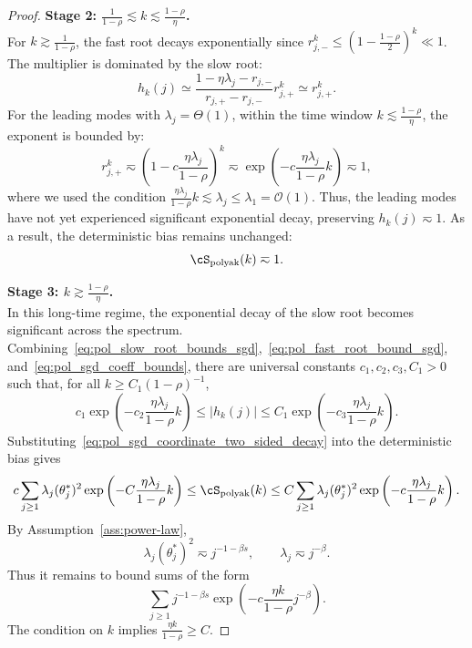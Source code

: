 \documentclass[11pt]{article}
\newcommand{\polyak}{\mathrm{polyak}}
\begin{document}
\begin{proof}
\textbf{Stage 2: $\frac{1}{1-\rho} \lesssim k \lesssim \frac{1-\rho}{\eta}$.} \\
For $k \gtrsim \frac{1}{1-\rho}$, the fast root decays exponentially since $r_{j,-}^k \le \left(1-\frac{1-\rho}{2}\right)^k \ll 1$. The multiplier is  dominated by the slow root:
\[
    h_k(j) \simeq \frac{1-\eta\lambda_j - r_{j,-}}{r_{j,+} - r_{j,-}} r_{j,+}^k \simeq r_{j,+}^k.
\]
For the leading modes with $\lambda_j = \Theta(1)$, within the time window $k \lesssim \frac{1-\rho}{\eta}$, the exponent is bounded by:
\[
    r_{j,+}^k \eqsim \left(1 - c\frac{\eta\lambda_j}{1-\rho}\right)^k \eqsim \exp\left(-c\frac{\eta\lambda_j}{1-\rho}k\right) \eqsim 1,
\]
where we used the condition $\frac{\eta\lambda_j}{1-\rho}k \lesssim \lambda_j \le \lambda_1 = \mathcal{O}(1)$. Thus, the leading modes have not yet experienced significant exponential decay, preserving $h_k(j) \eqsim 1$. As a result, the deterministic bias remains unchanged:
\[
    \cS_{\polyak}(k) \eqsim 1.
\]

\textbf{Stage 3: $k \gtrsim \frac{1-\rho}{\eta}$.} \\
In this long-time regime, the exponential decay of the slow root becomes significant across the spectrum. Combining~\eqref{eq:pol_slow_root_bounds_sgd},~\eqref{eq:pol_fast_root_bound_sgd}, and~\eqref{eq:pol_sgd_coeff_bounds}, there are universal constants $c_1,c_2,c_3,C_1>0$ such that, for all $k\ge C_1(1-\rho)^{-1}$,
\begin{equation}
\label{eq:pol_sgd_coordinate_two_sided_decay}
    c_1\exp\left(-c_2\frac{\eta\lambda_j}{1-\rho}k\right)
    \le
    |h_k(j)|
    \le
    C_1\exp\left(-c_3\frac{\eta\lambda_j}{1-\rho}k\right).
\end{equation}
Substituting~\eqref{eq:pol_sgd_coordinate_two_sided_decay} into the deterministic bias gives
\begin{equation}
\label{eq:pol_sgd_bias_spectral_comparison}
    c\sum_{j\ge1}\lambda_j(\theta_j^*)^2
    \exp\left(-C\frac{\eta\lambda_j}{1-\rho}k\right)
    \le
    \cS_{\polyak}(k)
    \le
    C\sum_{j\ge1}\lambda_j(\theta_j^*)^2
    \exp\left(-c\frac{\eta\lambda_j}{1-\rho}k\right).
\end{equation}
By Assumption~\ref{ass:power-law},
\[
    \lambda_j(\theta_j^*)^2\eqsim j^{-1-\beta s}, \qquad \lambda_j\eqsim j^{-\beta}.
\]
Thus it remains to bound sums of the form
\[
    \sum_{j\ge1}j^{-1-\beta s}
    \exp\left(-c\frac{\eta k}{1-\rho}j^{-\beta}\right).
\]
The condition on $k$ implies $\frac{\eta k}{1-\rho}\ge C$.


\end{proof}
\end{document}
